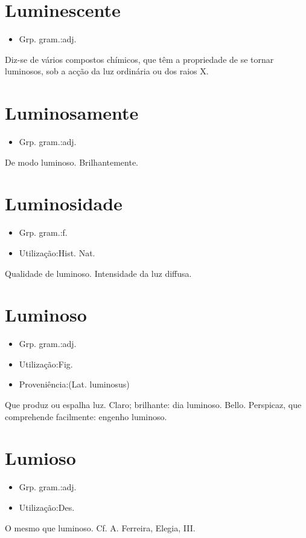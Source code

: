 \section{Luminescente}
\begin{itemize}
\item {Grp. gram.:adj.}
\end{itemize}
Diz-se de vários compostos chímicos, que têm a propriedade de se tornar luminosos, sob a acção da luz ordinária ou dos raios X.
\section{Luminosamente}
\begin{itemize}
\item {Grp. gram.:adj.}
\end{itemize}
De modo luminoso.
Brilhantemente.
\section{Luminosidade}
\begin{itemize}
\item {Grp. gram.:f.}
\end{itemize}
\begin{itemize}
\item {Utilização:Hist. Nat.}
\end{itemize}
Qualidade de luminoso.
Intensidade da luz diffusa.
\section{Luminoso}
\begin{itemize}
\item {Grp. gram.:adj.}
\end{itemize}
\begin{itemize}
\item {Utilização:Fig.}
\end{itemize}
\begin{itemize}
\item {Proveniência:(Lat. \textunderscore luminosus\textunderscore )}
\end{itemize}
Que produz ou espalha luz.
Claro; brilhante: \textunderscore dia luminoso\textunderscore .
Bello.
Perspicaz, que comprehende facilmente: \textunderscore engenho luminoso\textunderscore .
\section{Lumioso}
\begin{itemize}
\item {Grp. gram.:adj.}
\end{itemize}
\begin{itemize}
\item {Utilização:Des.}
\end{itemize}
O mesmo que \textunderscore luminoso\textunderscore . Cf. A. Ferreira, \textunderscore Elegia\textunderscore , III.
